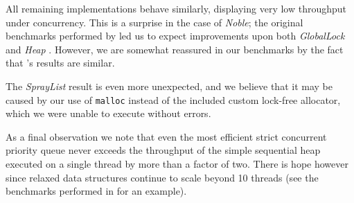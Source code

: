 All remaining implementations behave similarly, displaying very low throughput under concurrency.
This is a surprise in the case of \textit{Noble}; the original benchmarks performed by
\citeauthor{sundell2003fast} led us to expect improvements upon both \textit{GlobalLock}
and \textit{Heap} \cite{sundell2003fast}. However, we are somewhat reassured in our benchmarks by
the fact that \citeauthor{linden2013skiplist}'s results are similar.

The \textit{SprayList} result is even more unexpected, and we believe that it may be caused by
our use of \lstinline|malloc| instead of the included custom lock-free allocator, which we were
unable to execute without errors.

As a final observation we note that even the most efficient strict concurrent priority queue
never exceeds the throughput of the simple sequential heap executed on a single thread by more
than a factor of two. There is hope however since relaxed data structures continue to scale
beyond 10 threads (see the benchmarks performed in \cite{alistarhspraylist} for an example).
